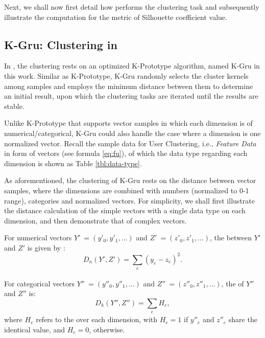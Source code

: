 Next, we shall now first detail how \sys{} performs the clustering task and subsequently illustrate the computation for the metric of Silhouette coefficient value.

\subsection{K-Gru: Clustering in \sys{}}
\label{sec:cluster}

In \sys{}, the clustering rests on an optimized K-Prototype \cite{IEEEexample:huang1997clustering} algorithm, named K-Gru in this work.
Similar as K-Prototype, K-Gru randomly selects the cluster kernels among samples and employs the minimum distance between them to determine an initial result, upon which the clustering tasks are iterated until the results are stable.

Unlike K-Prototype that supports vector samples in which each dimension is of numerical/categorical, K-Gru could also handle the case where a dimension is one normalized vector.
%
Recall the sample data for User Clustering, i.e., \textit{Feature Data} in form of vectors (see formula \ref{eq:fu}), of which the data type regarding each dimension is shown as Table \ref{tbl:data-type}.



As aforementioned, the clustering of K-Gru rests on the distance between vector samples, where the dimensions are combined with numbers (normalized to 0-1 range), categories and normalized vectors. For simplicity, we shall first illustrate the distance calculation of the simple vectors with a single data type on each dimension, and then demonstrate that of complex vectors.

For numerical vectors $Y'\ = (y'_0, y'_1, \ldots)$ and $Z'\ = (z'_0, z'_1, \ldots)$, the \od{} \cite{IEEEexample:books/mk/HanKP2011} between $Y'$ and $Z'$ is given by :
%
\begin{equation}
\label{eq:od}
D_n(Y', Z') = \sum_{\substack{e}} (y_e - z_e)^2.
\end{equation}

For categorical vectors $Y''\ = (y''_0, y''_1, \ldots)$ and  $Z''\ = (z''_0, z''_1, \ldots)$, the \hd{} \cite{IEEEexample:huang1997clustering} of $Y''$ and $Z''$ is:
%
\begin{equation}
\label{eq:hd}
D_h(Y'', Z'') = \sum_{\substack{e}} H_e,
\end{equation}
where $H_e$ refers to the \hd{} over each dimension, with $H_e = 1$ if $y''_e$ and $z''_e$ share the identical value, and $H_e = 0$, otherwise.

